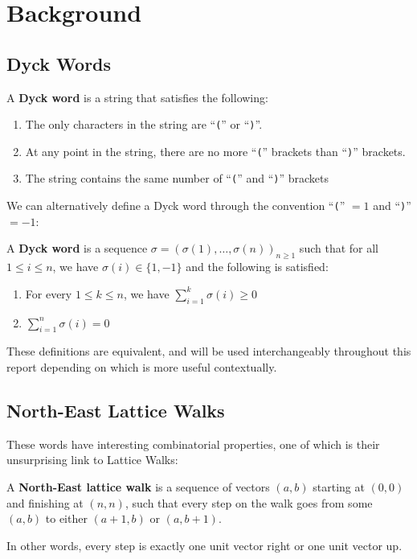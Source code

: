 \section{Background}

\subsection{Dyck Words}
\begin{definition}
    A \textbf{Dyck word} is a string that satisfies the following:
    \begin{enumerate}
        \item The only characters in the string are ``\texttt{(}'' or ``\texttt{)}''.
        \item At any point in the string, there are no more ``\texttt{(}'' brackets than ``\texttt{)}'' brackets.
        \item The string contains the same number of ``\texttt{(}'' and ``\texttt{)}'' brackets
    \end{enumerate}
\end{definition}

We can alternatively define a Dyck word through the convention ``\texttt{(}'' $= 1$ and ``\texttt{)}'' $= -1$:

\begin{definition}
    \label{def:seqDyck}
    A \textbf{Dyck word} is a sequence $\sigma=(\sigma(1), \dots, \sigma(n))_{n\geq 1}$ such that for all $1\leq i\leq n$, we have ${\sigma(i)}\in\{1, -1\}$ and the following is satisfied:
    \begin{enumerate}
        \item For every \! $1 \leq k \leq n$, we have \! $\sum_{i = 1}^{k} \sigma(i) \geq 0$ 
        \item $\sum_{i = 1}^{n} \sigma(i) = 0$
    \end{enumerate} 
\end{definition}

These definitions are equivalent, and will be used interchangeably throughout this report depending on which is more useful contextually.

\subsection{North-East Lattice Walks}
These words have interesting combinatorial properties, one of which is their unsurprising link to Lattice Walks:

\begin{definition} 
    A \textbf{North-East lattice walk} is a sequence of vectors $(a, b)$ starting at $(0, 0)$ and finishing at $(n, n)$, such that every step on the walk goes from some $(a, b)$ to either $(a+1, b)$ or $(a, b+1)$.
\end{definition}
In other words, every step is exactly one unit vector right or one unit vector up.

